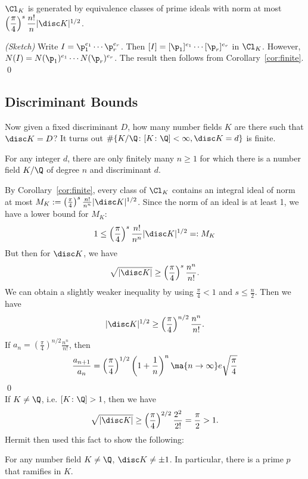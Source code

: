 \begin{cor}\label{cor:generated}
$\Cl_K$ is generated by equivalence classes of prime ideals with norm at most $\left(\dfrac{\pi}{4}\right)^s \dfrac{n!}{n} |\disc K|^{1/2}$. 
\end{cor}

\pf \emph{(Sketch)} Write $I= \p_1^{e_1} \cdots \p_r^{e_r}$. Then $[I]=[\p_1]^{e_1} \cdots [\p_r]^{e_r}$ in $\Cl_K$. However, $N(I)=N(\p_1)^{e_1} \cdots N(\p_r)^{e_r}$. The result then follows from Corollary~\ref{cor:finite}. \qed \\



\subsection{Discriminant Bounds}

Now given a fixed discriminant $D$, how many number fields $K$ are there such that $\disc K=D$? It turns out $\#\{ K/\Q \colon [K \colon \Q]<\infty, \disc K=d\}$ is finite. 

\begin{prop}
For any integer $d$, there are only finitely many $n \geq 1$ for which there is a number field $K/\Q$ of degree $n$ and discriminant $d$. 
\end{prop}

By Corollary~\ref{cor:finite}, every class of $\Cl_K$ contains an integral ideal of norm at most $M_K:=\left(\frac{\pi}{4}\right)^s \frac{n!}{n^n} |\disc K|^{1/2}$. Since the norm of an ideal is at least 1, we have a lower bound for $M_K$:
	\[
	1 \leq \left(\dfrac{\pi}{4}\right)^s \dfrac{n!}{n^n} |\disc K|^{1/2}=: M_K
	\]
But then for $\disc K$, we have
	\[
	\sqrt{|\disc K|} \geq \left(\dfrac{\pi}{4}\right)^s \dfrac{n^n}{n!}.
	\]
We can obtain a slightly weaker inequality by using $\frac{\pi}{4}<1$ and $s \leq \frac{n}{2}$. Then we have
	\[
	|\disc K|^{1/2} \geq \left(\dfrac{\pi}{4}\right)^{n/2} \dfrac{n^n}{n!}.
	\]
If $a_n= \left(\frac{\pi}{4}\right)^{n/2} \frac{n^n}{n!}$, then 
	\[
	\dfrac{a_{n+1}}{a_n}= \left(\dfrac{\pi}{4}\right)^{1/2} \left(1+ \dfrac{1}{n}\right)^n \ma{n \to \infty} e\sqrt{\dfrac{\pi}{4}}
	\] \qed \\


If $K \neq \Q$, i.e. $[K \colon \Q]>1$, then we have
	\[
	\sqrt{|\disc K|} \geq \left(\dfrac{\pi}{4}\right)^{2/2} \dfrac{2^2}{2!}= \dfrac{\pi}{2}>1.
	\]
Hermit then used this fact to show the following:

\begin{thm}[Hermite] \label{thm:hermite}
For any number field $K \neq \Q$, $\disc K \neq \pm 1$. In particular, there is a prime $p$ that ramifies in $K$. 
\end{thm}


